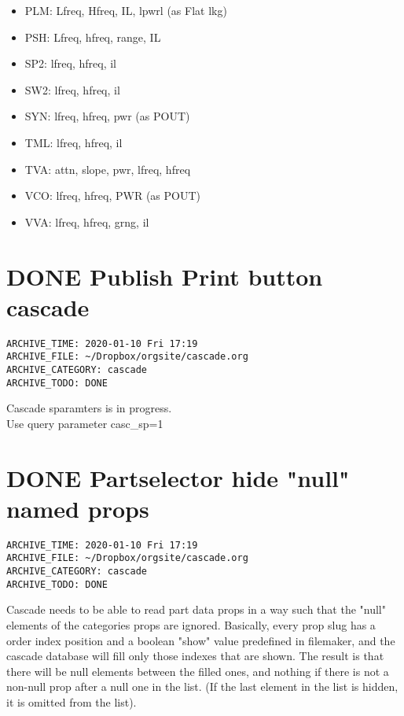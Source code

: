 \documentclass[11pt]{article}
\begin{document}
\begin{itemize}
\item PLM: Lfreq, Hfreq, IL, lpwrl (as Flat lkg)\\
\item PSH: Lfreq, hfreq, range, IL\\
\item SP2: lfreq, hfreq, il\\
\item SW2: lfreq, hfreq, il\\
\item SYN: lfreq, hfreq, pwr (as POUT)\\
\item TML: lfreq, hfreq, il\\
\item TVA: attn, slope, pwr, lfreq, hfreq\\
\item VCO: lfreq, hfreq, PWR (as POUT)\\
\item VVA: lfreq, hfreq, grng, il\\
\end{itemize}

\section*{{\bfseries\sffamily DONE}  Publish Print button cascade}
\label{sec:orgc992707}
\begin{verbatim}
ARCHIVE_TIME: 2020-01-10 Fri 17:19
ARCHIVE_FILE: ~/Dropbox/orgsite/cascade.org
ARCHIVE_CATEGORY: cascade
ARCHIVE_TODO: DONE
\end{verbatim}
Cascade sparamters is in progress.\\
Use query parameter casc\_sp=1\\

\section*{{\bfseries\sffamily DONE}  Partselector hide "null" named props}
\label{sec:org4ee6a4c}
\begin{verbatim}
ARCHIVE_TIME: 2020-01-10 Fri 17:19
ARCHIVE_FILE: ~/Dropbox/orgsite/cascade.org
ARCHIVE_CATEGORY: cascade
ARCHIVE_TODO: DONE
\end{verbatim}
Cascade needs to be able to read part data props in a way such that the "null" elements of the categories props are ignored. Basically, every prop slug has a order index position and a boolean "show" value predefined in filemaker, and the cascade database will fill only those indexes that are shown. The result is that there will be null elements between the filled ones, and nothing if there is not a non-null prop after a null one in the list. (If the last element in the list is hidden, it is omitted from the list).\\
\end{document}
